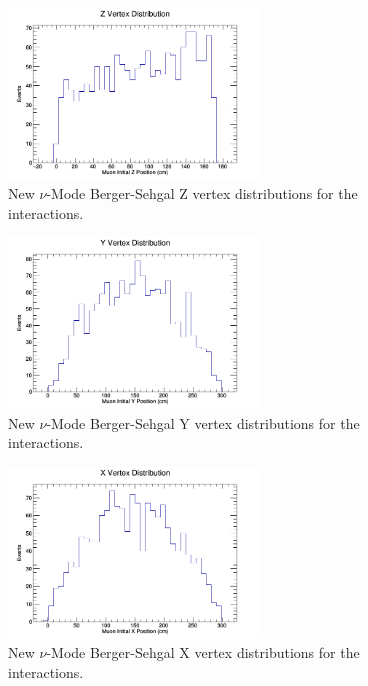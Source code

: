 \documentclass[11pt]{article}
\begin{document}
\begin{figure}[H]
\centering
\includegraphics[width=0.6\textwidth]{NewNMBergerSehgalImages/2-ZVertexDistributionNMBS.png}
\caption{New $\nu$-Mode Berger-Sehgal Z vertex distributions for the interactions.}
\end{figure}

\begin{figure}[H]
\centering
\includegraphics[width=0.6\textwidth]{NewNMBergerSehgalImages/3-YVertexDistributionNMBS.png}
\caption{New $\nu$-Mode Berger-Sehgal Y vertex distributions for the interactions.}
\end{figure}

\begin{figure}[H]
\centering
\includegraphics[width=0.6\textwidth]{NewNMBergerSehgalImages/4-XVertexDistributionNMBS.png}
\caption{New $\nu$-Mode Berger-Sehgal X vertex distributions for the interactions.}
\end{figure}
\end{document}
